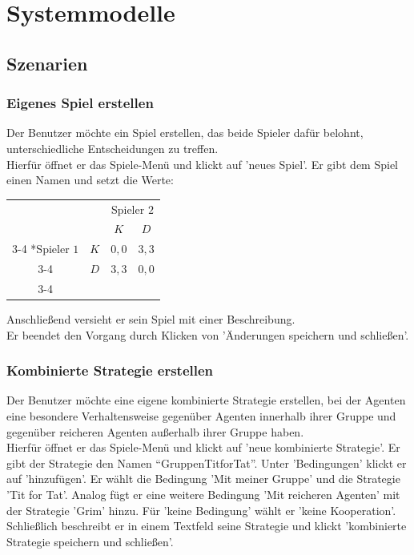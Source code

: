 \section{Systemmodelle}

\subsection{Szenarien}

\subsubsection{Eigenes Spiel erstellen}
Der Benutzer möchte ein Spiel erstellen, das beide Spieler dafür belohnt, unterschiedliche Entscheidungen zu treffen.\\
Hierfür öffnet er das Spiele-Menü und klickt auf 'neues Spiel'. Er gibt dem Spiel einen Namen und setzt die Werte:
\begin{table}[H]
\centering
\setlength{\extrarowheight}{2pt}
\begin{tabular}{cc|c|c|}
  & \multicolumn{1}{c}{} & \multicolumn{2}{c}{Spieler $2$} \\
  & \multicolumn{1}{c}{} & \multicolumn{1}{c}{$K$} & \multicolumn{1}{c}{$D$} \\\cline{3-4}
  \multirow{2}*{Spieler $1$} & $K$ & $0,0$ & $3,3$ \\\cline{3-4} 
  & $D$ & $3,3$ & $0,0$ \\\cline{3-4}
\end{tabular}
\end{table}
Anschließend versieht er sein Spiel mit einer Beschreibung.\\
Er beendet den Vorgang durch Klicken von 'Änderungen speichern und schließen'.

\subsubsection{Kombinierte Strategie erstellen}
Der Benutzer möchte eine eigene kombinierte Strategie erstellen, bei der Agenten eine besondere Verhaltensweise gegenüber Agenten innerhalb ihrer Gruppe und gegenüber reicheren Agenten außerhalb ihrer Gruppe haben.\\
Hierfür öffnet er das Spiele-Menü und klickt auf 'neue kombinierte Strategie'. Er gibt der Strategie den Namen "`GruppenTitforTat"'. Unter 'Bedingungen' klickt er auf 'hinzufügen'. Er wählt die Bedingung 'Mit meiner Gruppe' und die Strategie 'Tit for Tat'.
Analog fügt er eine weitere Bedingung 'Mit reicheren Agenten' mit der Strategie 'Grim' hinzu. Für 'keine Bedingung' wählt er 'keine Kooperation'. Schließlich beschreibt er in einem Textfeld seine Strategie und klickt 'kombinierte Strategie speichern und schließen'.

